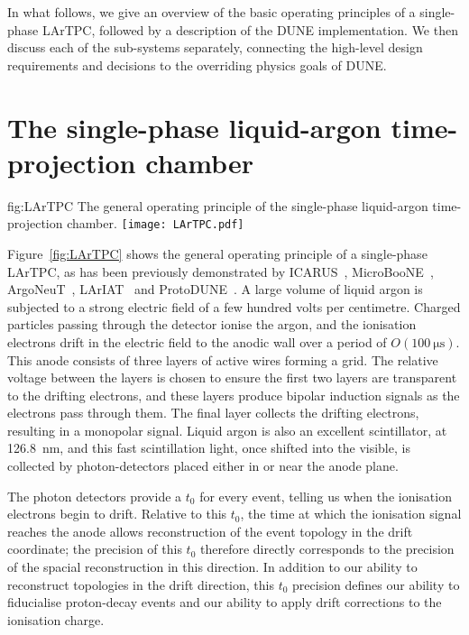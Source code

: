 In what follows, we give an overview of the basic operating principles of a single-phase LArTPC, followed by a description of the DUNE implementation. We then discuss each of the sub-systems separately, connecting the high-level design requirements and decisions to the overriding physics goals of DUNE.

\section{The single-phase liquid-argon time-projection chamber}
\label{sec:fdsp-exec-splar}

\begin{dunefigure}{fig:LArTPC}
{The general operating principle of the single-phase liquid-argon time-projection chamber.}
\texttt{[image: LArTPC.pdf]}
\end{dunefigure}

Figure~\ref{fig:LArTPC} shows the general operating principle of a single-phase LArTPC, as has been previously demonstrated by ICARUS~\cite{Icarus-T600}, MicroBooNE~\cite{ref:MicroBooNEDetectorPaper}, ArgoNeuT~\cite{Anderson:2012vc}, LArIAT~\cite{Cavanna:2014iqa} and ProtoDUNE~\cite{ref:ProtoDUNETDR}. A large volume of liquid argon is subjected to a strong electric field of a few hundred volts per centimetre. Charged particles passing through the detector ionise the argon, and the ionisation electrons drift in the electric field to the anodic wall over a period of $O(\SI{100}{\micro\second})$. This anode consists of three layers of active wires forming a grid. The relative voltage between the layers is chosen to ensure the first two layers are transparent to the drifting electrons, and these layers produce bipolar induction signals as the electrons pass through them. The final layer collects the drifting electrons, resulting in a monopolar signal. Liquid argon is also an excellent scintillator, at \SI{126.8}{\nano\meter}, and this fast scintillation light, once shifted into the visible, is collected by photon-detectors placed either in or near the anode plane.

The photon detectors provide a $t_{0}$ for every event, telling us when the ionisation electrons begin to drift. Relative to this $t_{0}$, the time at which the ionisation signal reaches the anode allows reconstruction of the event topology in the drift coordinate; the precision of this $t_{0}$ therefore directly corresponds to the precision of the spacial reconstruction in this direction. In addition to our ability to reconstruct topologies in the drift direction, this $t_{0}$ precision defines our ability to fiducialise proton-decay events and our ability to apply drift corrections to the ionisation charge.

